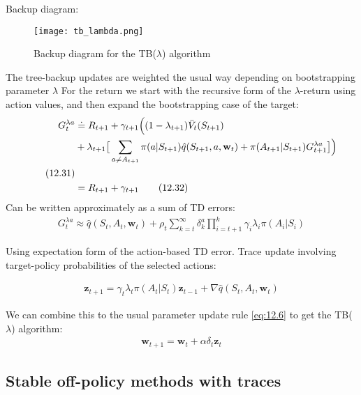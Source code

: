 \documentclass[sutton_barto_notes.tex]{subfiles}
\begin{document}
 Backup diagram: 

\begin{figure}[h!]
    \centering
     \texttt{[image: tb\_lambda.png]}
    \caption{ Backup diagram for the TB($\lambda$) algorithm }
\end{figure}


 The tree-backup updates are weighted the usual way depending on bootstrapping parameter $\lambda$
For the return we start with the recursive form of the $\lambda$-return using action values, and then expand the bootstrapping case of the target: 
\begin{align*}
\hspace*{-10cm}G_t^{\lambda a} & \doteq R_{t+1} + \gamma_{t+1} \Big( (1 - \lambda_{t+1}) \bar{V}_t(S_{t+1}) \\
& + \lambda_{t+1} \big[ \sum_{a \neq A_{t+1}} \pi(a|S_{t+1}) \hat{q}(S_{t+1}, a, \mathbf{w}_t) + \pi(A_{t+1}| S_{t+1}) G_{t+1}^{\lambda a} \big] \Big)\\\label{eq:12.31}\tag{12.31}\\
& = R_{t+1} + \gamma_{t+1} \label{eq:12.32}\tag{12.32}
\end{align*} 
 Can be written approximately as a sum of TD errors: 
\begin{align}
G_t^{\lambda a} \approx \hat{q}(S_{t}, A_t, \mathbf{w}_{t}) + \rho_t \sum_{k=t}^{\infty} \delta_k^a \prod_{i=t+1}^k \gamma_i \lambda_i \pi(A_i|S_i) \label{eq:12.33}\tag{12.33}
\end{align}

 Using expectation form of the action-based TD error.
Trace update involving target-policy probabilities of the selected actions: 

\begin{align}
\mathbf{z}_{t+1} = \gamma_t \lambda_t \pi(A_t| S_t) \mathbf{z}_{t-1} + \nabla \hat{q}(S_t, A_t, \mathbf{w}_{t}) \label{eq:12.34}\tag{12.34}
\end{align}

 We can combine this to the usual parameter update rule \ref{eq:12.6} to get the TB($\lambda$) algorithm: 
\begin{align}\mathbf{w}_{t+1} = \mathbf{w}_t + \alpha \delta_t \mathbf{z}_t\end{align}

\subsection{Stable off-policy methods with traces}
\end{document}
